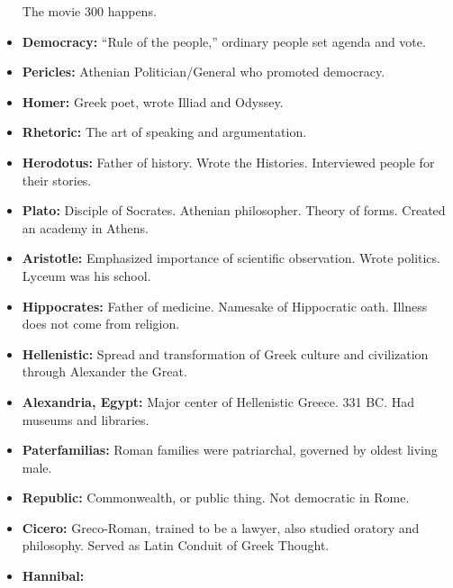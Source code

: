 \documentclass[crop=false,class=book]{standalone}
\begin{document}
\begin{itemize}[noitemsep]
                    The movie 300 happens.
                \item \textbf{Democracy:}
                    ``Rule of the people,'' ordinary people
                    set agenda and vote.
                \item \textbf{Pericles:}
                    Athenian Politician/General who
                    promoted democracy.
                \item \textbf{Homer:}
                    Greek poet, wrote Illiad and Odyssey.
                \item \textbf{Rhetoric:}
                    The art of speaking and argumentation.
                \item \textbf{Herodotus:}
                    Father of history. Wrote the Histories.
                    Interviewed people for their stories.
                \item \textbf{Plato:}
                    Disciple of Socrates. Athenian philosopher.
                    Theory of forms. Created an academy in Athens.
                \item \textbf{Aristotle:}
                    Emphasized importance of scientific observation.
                    Wrote politics. Lyceum was his school.
                \item \textbf{Hippocrates:}
                    Father of medicine. Namesake of Hippocratic
                    oath. Illness does not come from religion.
                \item \textbf{Hellenistic:}
                    Spread and transformation of Greek culture and
                    civilization through Alexander the Great.
                \item \textbf{Alexandria, Egypt:}
                    Major center of Hellenistic Greece. 331 BC.
                    Had museums and libraries.
                \item \textbf{Paterfamilias:}
                    Roman families were patriarchal, governed
                    by oldest living male.
                \item \textbf{Republic:}
                    Commonwealth, or public thing. Not democratic
                    in Rome.
                \item \textbf{Cicero:}
                    Greco-Roman, trained to be a lawyer,
                    also studied oratory and philosophy.
                    Served as Latin Conduit
                    of Greek Thought.
                \item \textbf{Hannibal:}

\end{itemize}
\end{document}
